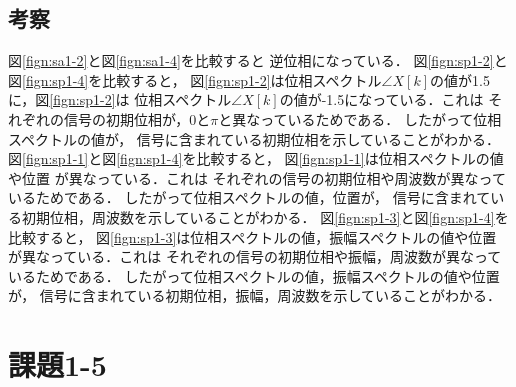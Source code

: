 \documentclass[11pt, a4paper, titlepage]{ltjsarticle}
\begin{document}
\subsection*{考察}
図\ref*{fign:sa1-2}と図\ref*{fign:sa1-4}を比較すると
逆位相になっている．
図\ref*{fign:sp1-2}と図\ref*{fign:sp1-4}を比較すると，
図\ref*{fign:sp1-2}は位相スペクトル$\angle X[k]$の値が1.5に，図\ref*{fign:sp1-2}は
位相スペクトル$\angle X[k]$の値が-1.5になっている．これは
それぞれの信号の初期位相が，0と$\pi$と異なっているためである．
したがって位相スペクトルの値が，
信号に含まれている初期位相を示していることがわかる．
図\ref*{fign:sp1-1}と図\ref*{fign:sp1-4}を比較すると，
図\ref*{fign:sp1-1}は位相スペクトルの値や位置
が異なっている．これは
それぞれの信号の初期位相や周波数が異なっているためである．
したがって位相スペクトルの値，位置が，
信号に含まれている初期位相，周波数を示していることがわかる．
図\ref*{fign:sp1-3}と図\ref*{fign:sp1-4}を比較すると，
図\ref*{fign:sp1-3}は位相スペクトルの値，振幅スペクトルの値や位置
が異なっている．これは
それぞれの信号の初期位相や振幅，周波数が異なっているためである．
したがって位相スペクトルの値，振幅スペクトルの値や位置が，
信号に含まれている初期位相，振幅，周波数を示していることがわかる．
\newpage
\section*{課題1-5}
\end{document}
